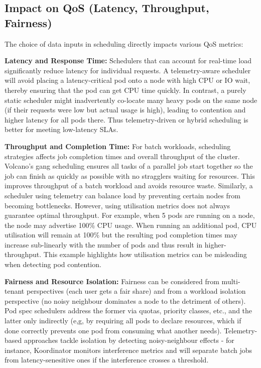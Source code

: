 \subsection{Impact on QoS (Latency, Throughput, Fairness)}
The choice of data inputs in scheduling directly impacts various QoS metrics:

\textbf{Latency and Response Time:} Schedulers that can account for real-time
load significantly reduce latency for individual requests. A telemetry-aware
scheduler will avoid placing a latency-critical pod onto a node with high CPU or
IO wait, thereby ensuring that the pod can get CPU time quickly. In contrast, a
purely static scheduler might inadvertently co-locate many heavy pods on the same
node (if their requests were low but actual usage is high), leading to
contention and higher latency for all pods there. Thus telemetry-driven or
hybrid scheduling is better for meeting low-latency SLAs.

\textbf{Throughput and Completion Time:} For batch workloads, scheduling
strategies affects job completion times and overall throughput of the cluster.
Volcano's \cite{} gang scheduling ensures all tasks of a parallel job start
together so the job can finish as quickly as possible with no stragglers waiting
for resources. This improves throughput of a batch workload and avoids resource
waste. Similarly, a scheduler using telemetry can balance load by preventing
certain nodes from becoming bottlenecks. However, using utilisation metrics does
not always guarantee optimal throughput. For example, when 5 pods are running on
a node, the node may advertise 100\% CPU usage. When running an additional pod,
CPU utilisation will remain at 100\% but the resulting pod completion times
may increase sub-linearly with the number of pods and thus result in
higher-throughput. This example highlights how utilisation metrics can be
misleading when detecting pod contention.

\textbf{Fairness and Resource Isolation:} Fairness can be considered from
multi-tenant perspectives (each user gets a fair share) and from a workload
isolation perspective (no noisy neighbour dominates a node to the detriment of
others). Pod spec schedulers address the former via quotas, priority classes,
etc., and the latter only indirectly (e,g, by requiring all pods to declare
resources, which if done correctly prevents one pod from consuming what another
needs). Telemetry-based approaches tackle isolation by detecting noisy-neighbour
effects - for instance, Koordinator monitors interference metrics and will
separate batch jobs from latency-senesitive ones if the interference crosses a
threshold.

